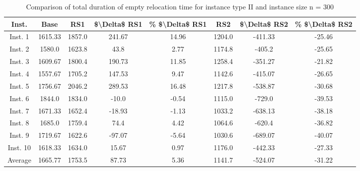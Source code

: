 \begin{table}[H]
\centering
\begin{tabular}{cccccccc}
  \hline
  \textbf{Inst.} & \textbf{Base} & \textbf{RS1} & \textbf{\$\textbackslash{}Delta\$  RS1} & \textbf{\% \$\textbackslash{}Delta\$  RS1} & \textbf{RS2} & \textbf{\$\textbackslash{}Delta\$  RS2} & \textbf{\% \$\textbackslash{}Delta\$  RS2} \\\hline
  Inst. 1 & 1615.33 & 1857.0 & 241.67 & 14.96 & 1204.0 & -411.33 & -25.46 \\
  Inst. 2 & 1580.0 & 1623.8 & 43.8 & 2.77 & 1174.8 & -405.2 & -25.65 \\
  Inst. 3 & 1609.67 & 1800.4 & 190.73 & 11.85 & 1258.4 & -351.27 & -21.82 \\
  Inst. 4 & 1557.67 & 1705.2 & 147.53 & 9.47 & 1142.6 & -415.07 & -26.65 \\
  Inst. 5 & 1756.67 & 2046.2 & 289.53 & 16.48 & 1217.8 & -538.87 & -30.68 \\
  Inst. 6 & 1844.0 & 1834.0 & -10.0 & -0.54 & 1115.0 & -729.0 & -39.53 \\
  Inst. 7 & 1671.33 & 1652.4 & -18.93 & -1.13 & 1033.2 & -638.13 & -38.18 \\
  Inst. 8 & 1685.0 & 1759.4 & 74.4 & 4.42 & 1064.6 & -620.4 & -36.82 \\
  Inst. 9 & 1719.67 & 1622.6 & -97.07 & -5.64 & 1030.6 & -689.07 & -40.07 \\
  Inst. 10 & 1618.33 & 1634.0 & 15.67 & 0.97 & 1176.0 & -442.33 & -27.33 \\
  Average & 1665.77 & 1753.5 & 87.73 & 5.36 & 1141.7 & -524.07 & -31.22 \\\hline
\end{tabular}
\caption{Comparison of total duration of empty relocation time for instance type II and instance size n = 300}
\label{tab:wait:resrelocation-empty-relocation-comparison_II_300}
\end{table}
